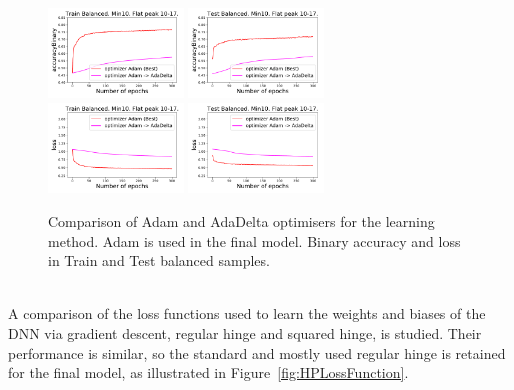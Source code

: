 \begin{figure}[!htb]
\centering
\includegraphics[width=0.32\textwidth]{plots/plot_01_1_overlay_graph_accuracyBinary_Train_Optimizer.pdf}
\includegraphics[width=0.32\textwidth]{plots/plot_01_1_overlay_graph_accuracyBinary_Test_Optimizer.pdf}\\
\includegraphics[width=0.32\textwidth]{plots/plot_01_1_overlay_graph_loss_Train_Optimizer.pdf}
\includegraphics[width=0.32\textwidth]{plots/plot_01_1_overlay_graph_loss_Test_Optimizer.pdf}\\
\caption{Comparison of Adam and AdaDelta optimisers for the learning method. Adam is used in the final model. Binary accuracy and loss in Train and Test balanced samples.}
\label{fig:HPOptimizer}
\end{figure}

\ \\A comparison of the loss functions used to learn the weights and biases of the DNN via gradient descent, regular hinge and squared hinge, is studied. Their performance is similar, so the standard and mostly used regular hinge is retained for the final model, as illustrated in Figure~\ref{fig:HPLossFunction}.

